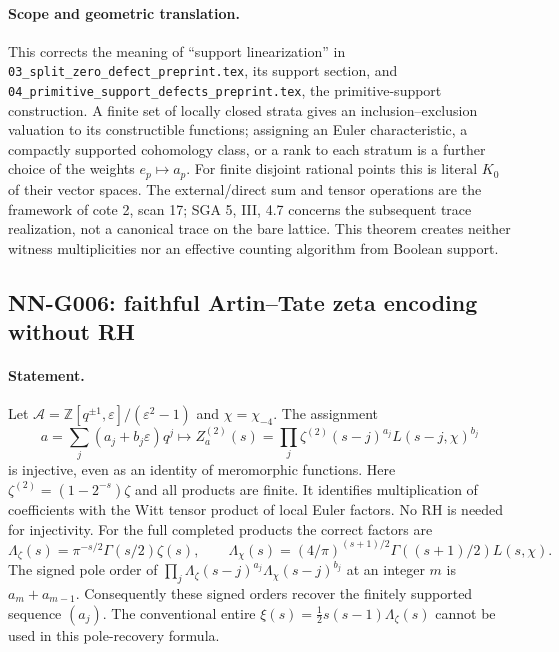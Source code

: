 \paragraph{Scope and geometric translation.}
This corrects the meaning of ``support linearization'' in
\texttt{03\_split\_zero\_defect\_preprint.tex}, its support section,
and \texttt{04\_primitive\_support\_defects\_preprint.tex}, the
primitive-support construction. A finite set of locally closed
strata gives an inclusion--exclusion valuation to its constructible
functions; assigning an Euler characteristic, a compactly supported
cohomology class, or a rank to each stratum is a further choice of
the weights $e_p\mapsto a_p$. For finite disjoint rational points
this is literal $K_0$ of their vector spaces. The external/direct
sum and tensor operations are the framework of cote 2, scan 17;
SGA 5, III, 4.7 concerns the subsequent trace realization, not a
canonical trace on the bare lattice. This theorem creates neither
witness multiplicities nor an effective counting algorithm from
Boolean support.

\subsection{NN-G006: faithful Artin--Tate zeta encoding without RH}
\paragraph{Statement.}
Let
$\mathcal A=\mathbb Z[q^{\pm1},\varepsilon]/(\varepsilon^2-1)$ and
$\chi=\chi_{-4}$. The assignment
\[
 a=\sum_j(a_j+b_j\varepsilon)q^j\longmapsto
 Z_a^{(2)}(s)=\prod_j\zeta^{(2)}(s-j)^{a_j}
                         L(s-j,\chi)^{b_j}                 \tag{G006.1}
\]
is injective, even as an identity of meromorphic functions. Here
$\zeta^{(2)}=(1-2^{-s})\zeta$ and all products are finite. It
identifies multiplication of coefficients with the Witt tensor
product of local Euler factors. No RH is needed for injectivity.
For the full completed products the correct factors are
\[
 \Lambda_\zeta(s)=\pi^{-s/2}\Gamma(s/2)\zeta(s),\qquad
 \Lambda_\chi(s)=(4/\pi)^{(s+1)/2}\Gamma((s+1)/2)L(s,\chi).
 \tag{G006.2}
\]
The signed pole order of
$\prod_j\Lambda_\zeta(s-j)^{a_j}\Lambda_\chi(s-j)^{b_j}$ at an
integer $m$ is $a_m+a_{m-1}$. Consequently these signed orders
recover the finitely supported sequence $(a_j)$. The conventional
entire $\xi(s)=\tfrac12s(s-1)\Lambda_\zeta(s)$ cannot be used
in this pole-recovery formula.

